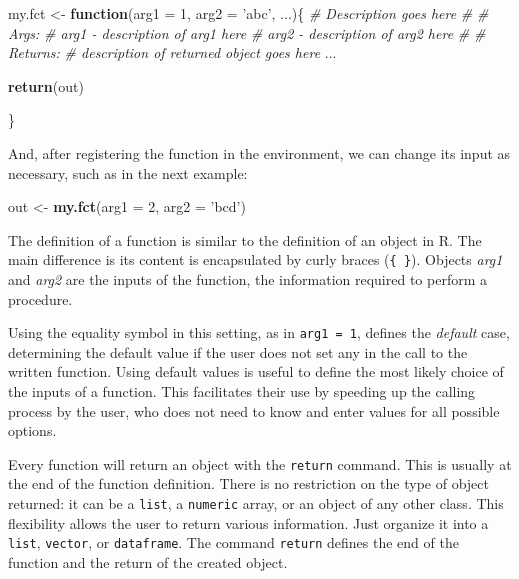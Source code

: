 \documentclass[11pt,]{book}
\newenvironment{Shaded}{\begin{snugshade}}{\end{snugshade}}
\newcommand{\KeywordTok}[1]{\textcolor[rgb]{0.27,0.27,0.27}{\textbf{#1}}}
\newcommand{\DataTypeTok}[1]{\textcolor[rgb]{0.27,0.27,0.27}{#1}}
\newcommand{\DecValTok}[1]{\textcolor[rgb]{0.06,0.06,0.06}{#1}}
\newcommand{\StringTok}[1]{\textcolor[rgb]{0.5,0.5,0.5}{#1}}
\newcommand{\CommentTok}[1]{\textcolor[rgb]{0.56,0.35,0.01}{\textit{#1}}}
\newcommand{\ControlFlowTok}[1]{\textcolor[rgb]{0.13,0.29,0.53}{\textbf{#1}}}
\newcommand{\NormalTok}[1]{#1}
\begin{document}
\begin{Shaded}
\begin{Highlighting}[]
\NormalTok{my.fct <-}\StringTok{ }\ControlFlowTok{function}\NormalTok{(}\DataTypeTok{arg1 =} \DecValTok{1}\NormalTok{, }\DataTypeTok{arg2 =} \StringTok{'abc'}\NormalTok{, ...)\{}
  \CommentTok{# Description goes here}
  \CommentTok{#}
  \CommentTok{# Args:}
  \CommentTok{#   arg1 - description of arg1 here}
  \CommentTok{#   arg2 - description of arg2 here}
  \CommentTok{#}
  \CommentTok{# Returns:}
  \CommentTok{#   description of returned object goes here}
\NormalTok{  ...}
  
  \KeywordTok{return}\NormalTok{(out)}
  
\NormalTok{\}}
\end{Highlighting}
\end{Shaded}

And, after registering the function in the environment, we can change
its input as necessary, such as in the next example:

\begin{Shaded}
\begin{Highlighting}[]
\NormalTok{out <-}\StringTok{ }\KeywordTok{my.fct}\NormalTok{(}\DataTypeTok{arg1 =} \DecValTok{2}\NormalTok{, }\DataTypeTok{arg2 =} \StringTok{'bcd'}\NormalTok{)}
\end{Highlighting}
\end{Shaded}

The definition of a function is similar to the definition of an object
in R. The main difference is its content is encapsulated by curly braces
(\texttt{\{\ \}}). Objects \emph{arg1} and \emph{arg2} are the inputs of
the function, the information required to perform a procedure.

Using the equality symbol in this setting, as in \texttt{arg1\ =\ 1},
defines the \emph{default} case, determining the default value if the
user does not set any in the call to the written function. Using default
values is useful to define the most likely choice of the inputs of a
function. This facilitates their use by speeding up the calling process
by the user, who does not need to know and enter values for all possible
options.

Every function will return an object with the \texttt{return} command.
This is usually at the end of the function definition. There is no
restriction on the type of object returned: it can be a \texttt{list}, a
\texttt{numeric} array, or an object of any other class. This
flexibility allows the user to return various information. Just organize
it into a \texttt{list}, \texttt{vector}, or \texttt{dataframe}. The
command \texttt{return} defines the end of the function and the return
of the created object.  
\end{document}
